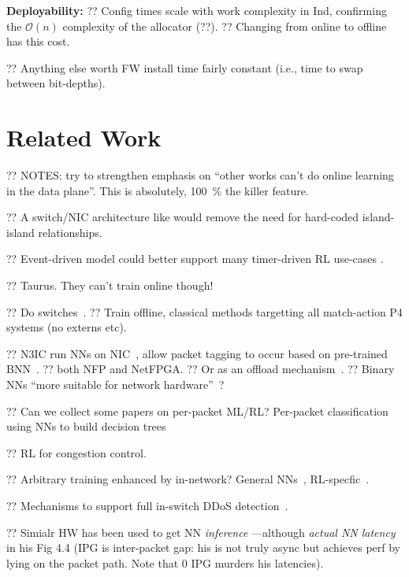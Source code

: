 \documentclass[sigconf,natbib=false]{acmart}
\newcommand{\fakepara}[1]{\noindent\textbf{#1:}}
\newcommand{\Indfw}{Ind}
\begin{document}
\fakepara{Deployability}
?? Config times scale with work complexity in \Indfw, confirming the $\mathcal{O}{\left(n\right)}$ complexity of the allocator (??).
?? Changing from online to offline has this cost.

?? Anything else worth FW install time fairly constant (i.e., time to swap between bit-depths).

\section{Related Work}

?? NOTES: try to strengthen emphasis on ``other works can't do online learning in the data plane''. This is absolutely, \SI{100}{\percent} the killer feature.

?? A switch/NIC architecture like \textcite{DBLP:conf/hotnets/StephensAS18} would remove the need for hard-coded island-island relationships.

?? Event-driven model could better support many timer-driven RL use-cases \textcite{DBLP:conf/hotnets/IbanezABM19}.

?? Taurus. They can't train online though!~\parencite{DBLP:journals/corr/abs-2002-08987}

?? Do switches~\parencite{DBLP:conf/hotnets/XiongZ19}.
?? Train offline, classical methods targetting all match-action P4 systems (no externs etc).

?? N3IC run NNs on NIC~\parencite{DBLP:journals/corr/abs-2009-02353}, allow packet tagging to occur based on pre-trained BNN~\parencite{DBLP:conf/nips/HubaraCSEB16}.
?? both NFP and NetFPGA.
?? Or as an offload mechanism~\parencite{DBLP:conf/sigcomm/SanvitoSB18,DBLP:journals/corr/abs-1801-05731}.
?? Binary NNs ``more suitable for network hardware''~\parencite{DBLP:journals/corr/MiyashitaLM16}?

?? Can we collect some papers on per-packet ML/RL? Per-packet classification using NNs to build decision trees~\parencite{DBLP:conf/sigcomm/LiangZJS19}

?? RL for congestion control. ~\parencite{DBLP:journals/corr/abs-1910-04054}

?? Arbitrary training enhanced by in-network? General NNs~\parencite{DBLP:conf/micro/LiPAYQPWSEK18}, RL-specfic~\parencite{DBLP:conf/isca/LiLYCSH19}.

?? Mechanisms to support full in-switch DDoS detection~\cite{tnms-ddos-victim-ident}.

?? Simialr HW has been used to get NN \emph{inference} \textcite{langlet-ml-netronome}---although \emph{actual NN latency} in his Fig 4.4 (IPG is inter-packet gap: his is not truly async but achieves perf by lying on the packet path. Note that 0 IPG murders his latencies).
\end{document}
